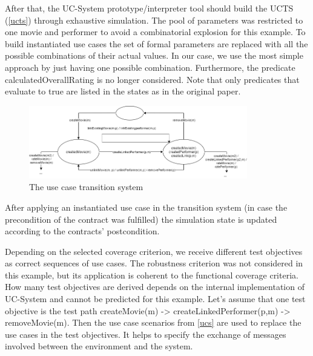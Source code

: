 After that, the UC-System prototype/interpreter tool should build the UCTS (\autoref{ucts}) through exhaustive simulation. The pool of parameters was restricted to one movie and performer to avoid a combinatorial explosion for this example. To build instantiated use cases the set of formal parameters are replaced with all the possible combinations of their actual values. In our case, we use the most simple approach by just having one possible combination. Furthermore, the predicate calculatedOverallRating is no longer considered. Note that only predicates that evaluate to true are listed in the states as in the original paper. 

\begin{figure}[h]
	\centering
	\includegraphics[width=0.85\textwidth]{../images/topic3_ucts.png}
	\caption{The use case transition system}
	\label{ucts}
\end{figure}

After applying an instantiated use case in the transition system (in case the precondition of the contract was fulfilled) the simulation state is updated according to the contracts' postcondition. 

\newpage

Depending on the selected coverage criterion, we receive different test objectives as correct sequences of use cases. The robustness criterion was not considered in this example, but its application is coherent to the functional coverage criteria. How many test objectives are derived depends on the internal implementation of UC-System and cannot be predicted for this example. Let's assume that one test objective is the test path createMovie(m) \mbox{-\textgreater} createLinkedPerformer(p,m) \mbox{-\textgreater} removeMovie(m). Then the use case scenarios from \autoref{ucs} are used to replace the use cases in the test objectives. It helps to specify the exchange of messages involved between the environment and the system.

